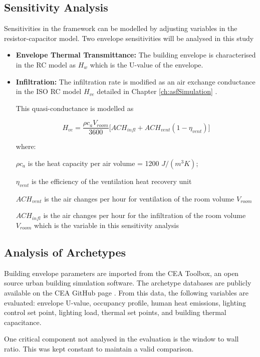 
\subsection{Sensitivity Analysis}

Sensitivities in the framework can be modelled by adjusting variables in the resistor-capacitor model. Two envelope sensitivities will be analysed in this study

\begin{itemize}

\item \textbf{Envelope Thermal Transmittance:} The building envelope is characterised in the RC model as $H_w$ which is the U-value of the envelope. 
\item \textbf{Infiltration:} The infiltration rate is modified as an air exchange conductance in the ISO RC model $H_{ve}$ detailed in Chapter \ref{ch:asfSimulation} \cite{de2008iso,jayathissa2017AE}.

This quasi-conductance is modelled as

\begin{equation} 
\label{eq:vent}
      H_{ve}= \frac{\rho c_a V_{room}}{3600}\Big[ ACH_{infl} + ACH_{vent}(1-\eta_{vent}) \Big]
\end{equation}

where: 

$\rho c_a$ is the heat capacity per air volume = 1200 $J/(m^3 K)$;

$\eta_{vent}$ is the efficiency of the ventilation heat recovery unit

$ACH_{vent}$ is the air changes per hour for ventilation of the room volume $V_{room}$

$ACH_{infl}$ is the air changes per hour for the infiltration of the room volume $V_{room}$ which is the variable in this sensitivity analysis

\end{itemize}


\subsection{Analysis of Archetypes}

Building envelope parameters are imported from the CEA Toolbox, an open source urban building simulation software. The archetype databases are publicly available on the CEA GitHub page \cite{CEAArchetypes,CEAToolbox}. From this data, the following variables are evaluated: envelope U-value, occupancy profile, human heat emissions, lighting control set point, lighting load, thermal set points, and building thermal capacitance.

One critical component not analysed in the evaluation is the window to wall ratio. This was kept constant to maintain a valid comparison.




